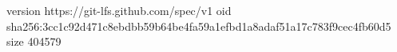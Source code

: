 version https://git-lfs.github.com/spec/v1
oid sha256:3cc1c92d471c8ebdbb59b64be4fa59a1efbd1a8adaf51a17c783f9cec4fb60d5
size 404579
